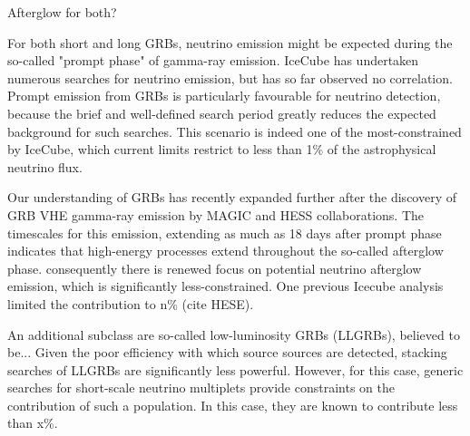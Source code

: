 Afterglow for both?

For both short and long GRBs, neutrino emission might be expected during the so-called "prompt phase" of gamma-ray emission. IceCube has undertaken numerous searches for neutrino emission, but has so far observed no correlation. Prompt emission from GRBs is particularly favourable for neutrino detection, because the brief and well-defined search period greatly reduces the expected background for such searches. This scenario is indeed one of the most-constrained by IceCube, which current limits restrict to less than 1\% of the astrophysical neutrino flux. 

Our understanding of GRBs has recently expanded further after the discovery of GRB VHE gamma-ray emission by MAGIC and HESS collaborations. The timescales for this emission, extending as much as 18 days after prompt phase indicates that high-energy processes extend throughout the so-called afterglow phase. consequently there is renewed focus on potential neutrino afterglow  emission, which is significantly less-constrained. One previous Icecube analysis limited the contribution to n\% (cite HESE).

An additional subclass are so-called low-luminosity GRBs (LLGRBs), believed to be... Given the poor efficiency with which source sources are detected, stacking searches of LLGRBs are significantly less powerful. However, for this case, generic searches for short-scale neutrino multiplets provide constraints on the contribution of such a population. In this case, they are known to contribute less than x\%.
